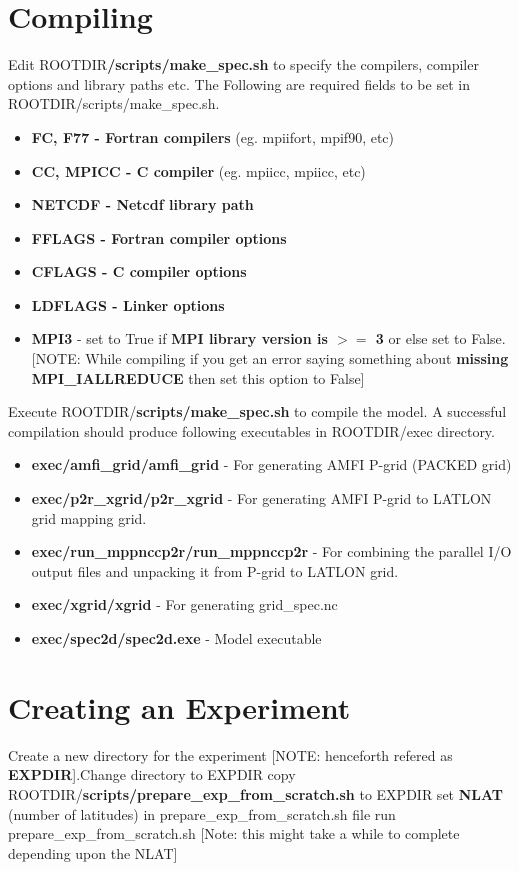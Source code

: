 \documentclass{article}
\begin{document}
\section{Compiling}
Edit ROOTDIR\textbf{/scripts/make\_spec.sh} to specify the compilers, compiler options and library paths etc.\newline
The Following are required fields to be set in ROOTDIR/scripts/make\_spec.sh.
\begin{itemize}
    \item \textbf{FC, F77 - Fortran compilers} (eg. mpiifort, mpif90, etc)
    \item \textbf{CC, MPICC - C compiler} (eg. mpiicc, mpiicc, etc)
    \item \textbf{NETCDF - Netcdf library path} 
    \item \textbf{FFLAGS - Fortran compiler options}
    \item \textbf{CFLAGS - C compiler options}
    \item \textbf{LDFLAGS - Linker options}
    \item \textbf{MPI3} - set to True if \textbf{MPI library version is $>=$ 3} or else set to False. [NOTE: While compiling if you get an error saying something about \textbf{missing MPI\_IALLREDUCE} then set this option to False]
\end{itemize}
Execute ROOTDIR/\textbf{scripts/make\_spec.sh} to compile the model.\newline
A successful compilation should produce following executables in ROOTDIR/exec directory.
\begin{itemize}
    \item \textbf{exec/amfi\_grid/amfi\_grid} - For generating AMFI P-grid (PACKED grid)
    \item \textbf{exec/p2r\_xgrid/p2r\_xgrid} - For generating AMFI P-grid to LATLON grid mapping grid.
    \item \textbf{exec/run\_mppnccp2r/run\_mppnccp2r} - For combining the parallel I/O output files and unpacking it from P-grid to LATLON grid.
    \item \textbf{exec/xgrid/xgrid} - For generating grid\_spec.nc
    \item \textbf{exec/spec2d/spec2d.exe} - Model executable
\end{itemize}

\section{Creating an Experiment}
Create a new directory for the experiment [NOTE: henceforth refered as \textbf{EXPDIR}].\newline Change directory to EXPDIR \newline
copy ROOTDIR/\textbf{scripts/prepare\_exp\_from\_scratch.sh} to EXPDIR \newline
set \textbf{NLAT} (number of latitudes) in prepare\_exp\_from\_scratch.sh file\newline
run prepare\_exp\_from\_scratch.sh [Note: this might take a while to complete depending upon the NLAT]\newline
\end{document}
